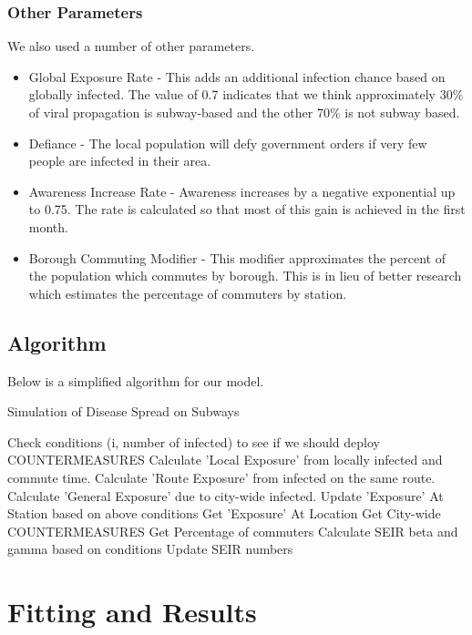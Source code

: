 \documentclass[12pt, a4, epsf] {article}
\theoremstyle{plain}
\theoremstyle{definition}
\begin{document}
\subsubsection{Other Parameters}
We also used a number of other parameters.
\begin{itemize}
    \item Global Exposure Rate - This adds an additional infection chance based on globally infected. The value of 0.7 indicates that we think approximately 30\% of viral propagation is subway-based and the other 70\% is not subway based.
    \item Defiance - The local population will defy government orders if very few people are infected in their area.
    \item Awareness Increase Rate - Awareness increases by a negative exponential up to 0.75. The rate is calculated so that most of this gain is achieved in the first month.
    \item Borough Commuting Modifier - This modifier approximates the percent of the population which commutes by borough. This is in lieu of better research which estimates the percentage of commuters by station.
\end{itemize}
\subsection{Algorithm}
Below is a simplified algorithm for our model.
\begin{algorithm}
\caption{Simulation of Disease Spread on Subways}\label{euclid}
\begin{algorithmic}[1]
    \State Check conditions (i, number of infected) to see if we should deploy COUNTERMEASURES
        \State Calculate 'Local Exposure' from locally infected and commute time.
        \State Calculate 'Route Exposure' from infected on the same route.
        \State Calculate 'General Exposure' due to city-wide infected.
        \State Update 'Exposure' At Station based on above conditions
    \EndFor
        \State Get 'Exposure' At Location
        \State Get City-wide COUNTERMEASURES
        \State Get Percentage of commuters
        \State Calculate SEIR beta and gamma based on conditions
        \State Update SEIR numbers
    \EndFor
\EndFor
\end{algorithmic}
\end{algorithm}
\FloatBarrier
\section{Fitting and Results}
\end{document}
